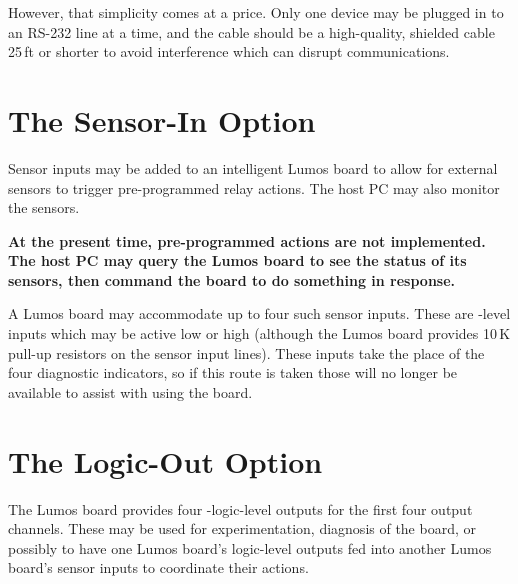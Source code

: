 \documentclass[letterpaper,twoside,onecolumn,openright,final]{memoir}
\begin{document}
However, that simplicity comes at a price.  Only one device may be plugged in to an RS-232 line
at a time, and the cable should be a high-quality, shielded cable 25\,ft or shorter to avoid
interference which can disrupt communications.

\section{The Sensor-In Option}
Sensor inputs  may be added to an intelligent Lumos board to allow for external
sensors to trigger pre-programmed relay actions.  The host PC may also monitor the
sensors.

{\bfseries At the present time, pre-programmed actions are not implemented.  The host PC
may query the Lumos board to see the status of its sensors, then command the board to do
something in response.}

A Lumos board may accommodate up to four such sensor inputs.  These are -level inputs
which may be active low or high (although the Lumos board provides 10\,K pull-up resistors on the
sensor input lines).  These inputs take the place of the four diagnostic  indicators,
so if this route is taken those will no longer be available to assist with using the board.

\section{The Logic-Out Option}
The Lumos board provides four -logic-level outputs  
for the first four output channels.  These may be used for experimentation, diagnosis of the board,
or possibly to have one Lumos board's logic-level outputs fed into another Lumos board's sensor inputs
to coordinate their actions.
\end{document}
